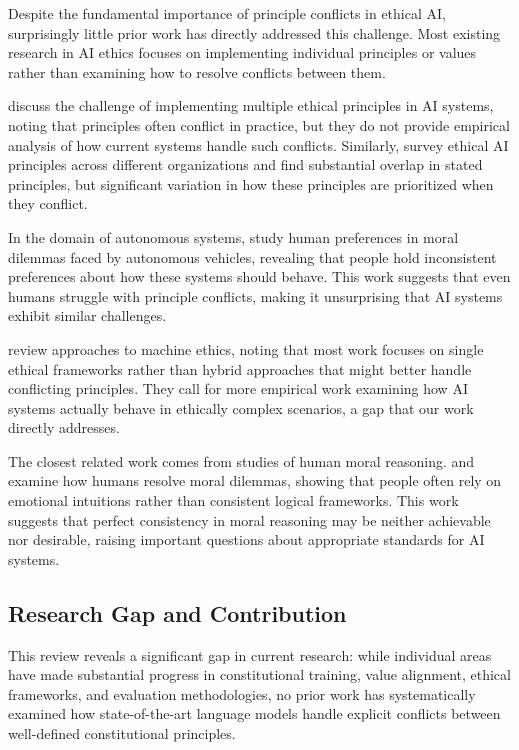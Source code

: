 \documentclass[11pt,a4paper]{article}
\begin{document}
Despite the fundamental importance of principle conflicts in ethical AI, surprisingly little prior work has directly addressed this challenge. Most existing research in AI ethics focuses on implementing individual principles or values rather than examining how to resolve conflicts between them.

\citet{floridi2019translating} discuss the challenge of implementing multiple ethical principles in AI systems, noting that principles often conflict in practice, but they do not provide empirical analysis of how current systems handle such conflicts. Similarly, \citet{jobin2019global} survey ethical AI principles across different organizations and find substantial overlap in stated principles, but significant variation in how these principles are prioritized when they conflict.

In the domain of autonomous systems, \citet{bonnefon2016social} study human preferences in moral dilemmas faced by autonomous vehicles, revealing that people hold inconsistent preferences about how these systems should behave. This work suggests that even humans struggle with principle conflicts, making it unsurprising that AI systems exhibit similar challenges.

\citet{winfield2021review} review approaches to machine ethics, noting that most work focuses on single ethical frameworks rather than hybrid approaches that might better handle conflicting principles. They call for more empirical work examining how AI systems actually behave in ethically complex scenarios, a gap that our work directly addresses.

The closest related work comes from studies of human moral reasoning. \citet{greene2001emotional} and \citet{haidt2001emotional} examine how humans resolve moral dilemmas, showing that people often rely on emotional intuitions rather than consistent logical frameworks. This work suggests that perfect consistency in moral reasoning may be neither achievable nor desirable, raising important questions about appropriate standards for AI systems.

\subsection{Research Gap and Contribution}

This review reveals a significant gap in current research: while individual areas have made substantial progress in constitutional training, value alignment, ethical frameworks, and evaluation methodologies, no prior work has systematically examined how state-of-the-art language models handle explicit conflicts between well-defined constitutional principles.
\end{document}
